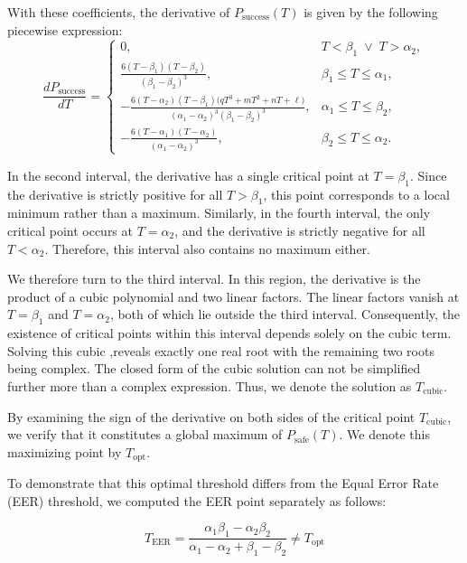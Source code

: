 \documentclass[sigconf]{acmart}
\theoremstyle{definition}
\begin{document}
With these coefficients, the derivative of $P_{\text{success}}(T)$ is given by the following piecewise expression:
\[
\frac{dP_{\text{success}}}{dT} =
\begin{cases}
0, & T < \beta_1 \;\lor\; T > \alpha_2, \\[6pt]

\displaystyle
\frac{6 (T-\beta_1) (T-\beta_2)}{(\beta_1-\beta_2)^3},
& \beta_1 \le T \le \alpha_1, \\[12pt]

\displaystyle
-\frac{6 (T-\alpha_2)(T-\beta_1)\bigl(qT^3 + mT^2 + nT + \ell\bigr)}
     {(\alpha_1-\alpha_2)^3 (\beta_1-\beta_2)^3},
& \alpha_1 \le T \le \beta_2, \\[12pt]

\displaystyle
-\frac{6 (T-\alpha_1) (T-\alpha_2)}{(\alpha_1-\alpha_2)^3},
& \beta_2 \le T \le \alpha_2.
\end{cases}
\]

In the second interval, the derivative has a single critical point at $T=\beta_{1}$. Since the derivative is strictly positive for all $T>\beta_{1}$, this point corresponds to a local minimum rather than a maximum. Similarly, in the fourth interval, the only critical point occurs at $T=\alpha_{2}$, and the derivative is strictly negative for all $T<\alpha_{2}$. Therefore, this interval also contains no maximum either.

We therefore turn to the third interval. In this region, the derivative is the product of a cubic polynomial and two linear factors. The linear factors vanish at $T=\beta_{1}$ and $T=\alpha_{2}$, both of which lie outside the third interval. Consequently, the existence of critical points within this interval depends solely on the cubic term. Solving this cubic ,reveals exactly one real root with the remaining two roots being complex. The closed form of the cubic solution can not be simplified further more than a complex expression. Thus, we denote the solution as $T_{\text{cubic}}$.

By examining the sign of the derivative on both sides of the critical point $T_{\text{cubic}}$, we verify that it constitutes a global maximum of $P_{\text{safe}}(T)$. We denote this maximizing point by $T_{\text{opt}}$.

To demonstrate that this optimal threshold differs from the Equal Error Rate (EER) threshold, we computed the EER point separately as follows:

\[T_{\text{EER}} = \frac{\alpha_1 \beta_1 - \alpha_2 \beta_2}{\alpha_1 - \alpha_2 + \beta_1 - \beta_2} \neq T_{\text{opt}}
\]
\end{document}
